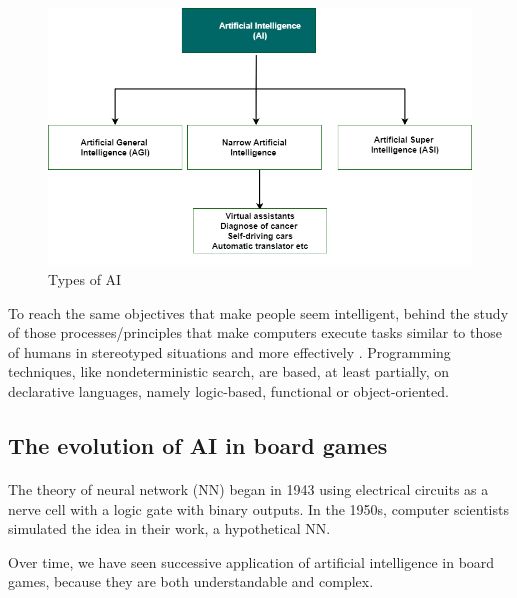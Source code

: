 \begin{figure}[ht]
    \centering
    \includegraphics[scale=0.6]{figures/AItypes.png}
    \caption{Types of AI}
    \label{fig:AIty}
\end{figure}




To reach the same objectives that make people seem intelligent, behind the study of those processes/principles that make computers execute tasks similar to those of humans in stereotyped situations and  more effectively  \citet{russell2016artificial}.  
Programming techniques, like nondeterministic search, are based, at least partially, on declarative languages, namely logic-based, functional or object-oriented.


\subsection{The evolution of AI in board games}


\paragraph{} The theory of neural network (NN) began in 1943 using electrical circuits as a nerve cell with a logic gate with binary outputs.  In the 1950s, computer scientists simulated the idea in their work, a hypothetical NN.


Over time, we have seen successive application of artificial intelligence in board games, because they are both understandable and complex.

